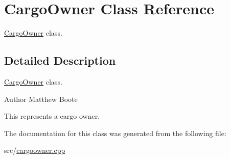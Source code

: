 \hypertarget{classCargoOwner}{}\section{Cargo\+Owner Class Reference}
\label{classCargoOwner}


\hyperlink{classCargoOwner}{Cargo\+Owner} class.  




\subsection{Detailed Description}
\hyperlink{classCargoOwner}{Cargo\+Owner} class. 

\begin{DoxyAuthor}{Author}
Matthew Boote
\end{DoxyAuthor}
This represents a cargo owner. 

The documentation for this class was generated from the following file\+:\begin{DoxyCompactItemize}
\item 
src/\hyperlink{cargoowner_8cpp}{cargoowner.\+cpp}\end{DoxyCompactItemize}
